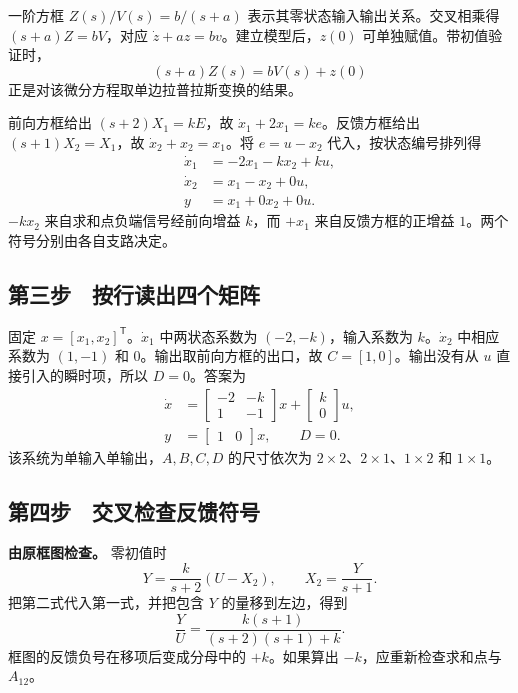 一阶方框 $Z(s)/V(s)=b/(s+a)$ 表示其零状态输入输出关系。交叉相乘得 $(s+a)Z=bV$，对应 $\dot z+az=bv$。建立模型后，$z(0)$ 可单独赋值。带初值验证时，
\[
 (s+a)Z(s)=bV(s)+z(0)
\]
正是对该微分方程取单边拉普拉斯变换的结果。

前向方框给出 $(s+2)X_1=kE$，故 $\dot x_1+2x_1=ke$。反馈方框给出 $(s+1)X_2=X_1$，故 $\dot x_2+x_2=x_1$。将 $e=u-x_2$ 代入，按状态编号排列得
\[
\begin{aligned}
 \dot x_1&=-2x_1-kx_2+ku,\\
 \dot x_2&=x_1-x_2+0u,\\
 y&=x_1+0x_2+0u.
\end{aligned}
\]
$-kx_2$ 来自求和点负端信号经前向增益 $k$，而 $+x_1$ 来自反馈方框的正增益 $1$。两个符号分别由各自支路决定。

\subsection{第三步　按行读出四个矩阵}

固定 $x=[x_1,x_2]^{\mathsf T}$。$\dot x_1$ 中两状态系数为 $(-2,-k)$，输入系数为 $k$。$\dot x_2$ 中相应系数为 $(1,-1)$ 和 $0$。输出取前向方框的出口，故 $C=[1,0]$。输出没有从 $u$ 直接引入的瞬时项，所以 $D=0$。答案为
\[
 \boxed{\begin{aligned}
 \dot x&=\begin{bmatrix}-2&-k\\1&-1\end{bmatrix}x+
            \begin{bmatrix}k\\0\end{bmatrix}u,\\
 y&=\begin{bmatrix}1&0\end{bmatrix}x,\qquad D=0.
 \end{aligned}}
\]
该系统为单输入单输出，$A,B,C,D$ 的尺寸依次为 $2\times2$、$2\times1$、$1\times2$ 和 $1\times1$。

\subsection{第四步　交叉检查反馈符号}

\textbf{由原框图检查。} 零初值时
\[
Y=\frac{k}{s+2}(U-X_2),\qquad X_2=\frac{Y}{s+1}.
\]
把第二式代入第一式，并把包含 $Y$ 的量移到左边，得到
\[
 \frac{Y}{U}=\frac{k(s+1)}{(s+2)(s+1)+k}.
\]
框图的反馈负号在移项后变成分母中的 $+k$。如果算出 $-k$，应重新检查求和点与 $A_{12}$。


